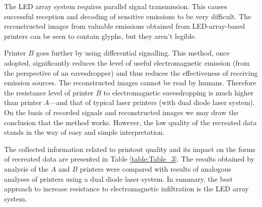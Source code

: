 \documentclass[letterpaper,journal]{ieeetran}
\begin{document}
The LED array system requires parallel signal transmission. This causes
successful reception and decoding of sensitive emissions to be very
difficult. The reconstructed images from valuable emissions obtained from
LED-array-based printers can be seen to contain glyphs, but they
aren't legible.

Printer $B$ goes further by using differential signalling. This method, once
adopted, significantly reduces the level of useful electromagnetic emission
(from the perspective of an eavesdropper) and thus reduces the effectiveness
of receiving emission sources. The reconstructed images cannot be read by
humans. Therefore the resistance level of printer $B$ to electromagnetic
eavesdropping is much higher than printer $A$---and that of typical
laser printers (with dual diode laser system). On the basis of recorded
signals and reconstructed images we may draw the conclusion that the method
works. However, the low quality of the recreated data stands in the way of
easy and simple interpretation.

The collected information related to printout quality and its impact on the
forms of recreated data are presented in Table \ref{table:Table_3}. The
results obtained by analysis of the $A$ and $B$ printers were compared with
results of analogous analyses of printers using a dual diode laser system. In
summary, the best approach to increase resistance to electromagnetic
infiltration is the LED array system.

\singlespacing



\end{document}

